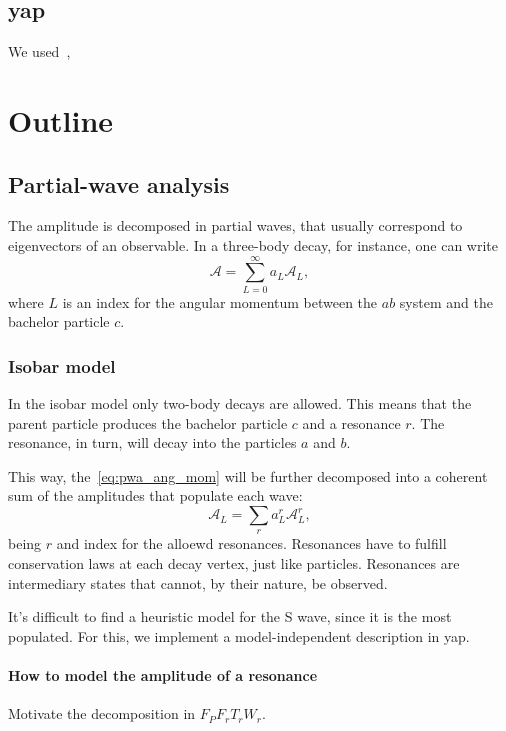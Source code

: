 \documentclass[
	10pt,
	twoside,
	openright,
]{scrbook}
\newcommand{\A}{\ensuremath{\mathcal{A}}}
\begin{document}
\section{\acs{yap}}

We used~\cite{stl_meyers,effective_cpp_meyers},

\chapter{Outline}
    \section{Partial-wave analysis}
    The amplitude is decomposed in partial waves, that usually correspond to eigenvectors of an observable.
    In a three-body decay, for instance, one can write
    \begin{equation}\label{eq:pwa_ang_mom}
        \A = \sum_{L=0}^\infty a_L \A_L,
    \end{equation}
    where $L$ is an index for the angular momentum between the $ab$ system and the bachelor particle $c$.

    \subsection{Isobar model}
    In the isobar model only two-body decays are allowed.
    This means that the parent particle produces the bachelor particle $c$ and a resonance $r$.
    The resonance, in turn, will decay into the particles $a$ and $b$.


    This way, the~\eqref{eq:pwa_ang_mom} will be further decomposed into a coherent sum of the amplitudes that populate each wave:
    \begin{equation}
        \A_L = \sum_r a_L^r \A_L^r,
    \end{equation}
    being $r$ and index for the alloewd resonances.
    Resonances have to fulfill conservation laws at each decay vertex, just like particles.
    Resonances are intermediary states that cannot, by their nature, be observed.



    It's difficult to find a heuristic model for the S wave, since it is the most populated.
    For this, we implement a model-independent description in \ac{yap}.

        \subsubsection{How to model the amplitude of a resonance}
        Motivate the decomposition in $F_P F_r T_r W_r$.
\end{document}
